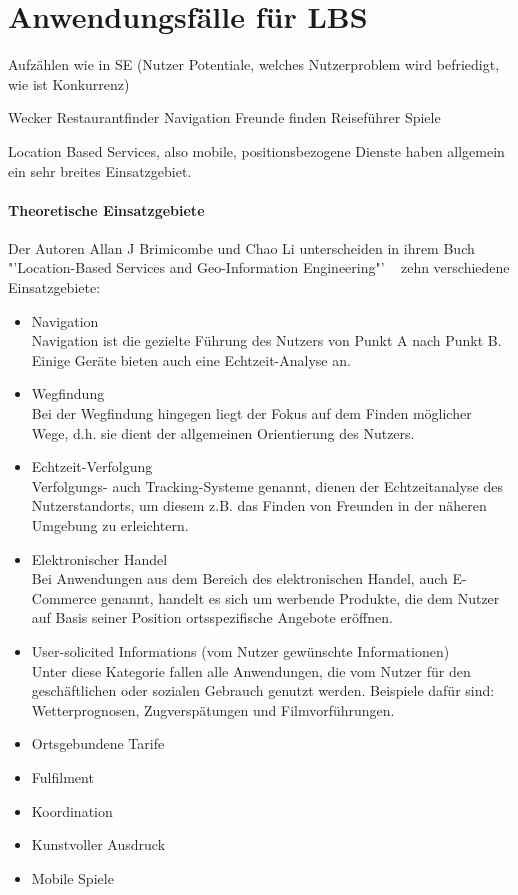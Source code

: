 \section{Anwendungsfälle für LBS}

Aufzählen wie in SE (Nutzer Potentiale, welches Nutzerproblem wird befriedigt, wie ist Konkurrenz)

Wecker
Restaurantfinder
Navigation
Freunde finden
Reiseführer
Spiele



Location Based Services, also mobile, positionsbezogene Dienste haben allgemein ein sehr breites Einsatzgebiet.\\
\paragraph{Theoretische Einsatzgebiete}
Der Autoren Allan J Brimicombe und Chao Li unterscheiden in ihrem Buch "'Location-Based Services and Geo-Information Engineering"' ~\cite[S.132]{brimicombe_li:application_area} zehn verschiedene Einsatzgebiete:
\begin{itemize}
	\item Navigation\\
Navigation ist die gezielte Führung des Nutzers von Punkt A nach Punkt B. Einige Geräte bieten auch eine Echtzeit-Analyse an.
	\item Wegfindung\\
Bei der Wegfindung hingegen liegt der Fokus auf dem Finden möglicher Wege, d.h. sie dient der allgemeinen Orientierung des Nutzers.
	\item Echtzeit-Verfolgung\\
Verfolgungs- auch Tracking-Systeme genannt, dienen der Echtzeitanalyse des Nutzerstandorts, um diesem z.B. das Finden von Freunden in der näheren Umgebung zu erleichtern.
	\item Elektronischer Handel\\
Bei Anwendungen aus dem Bereich des elektronischen Handel, auch E-Commerce genannt, handelt es sich um werbende Produkte, die dem Nutzer auf Basis seiner Position ortsspezifische Angebote eröffnen.
	\item User-solicited Informations (vom Nutzer gewünschte Informationen)\\
Unter diese Kategorie fallen alle Anwendungen, die vom Nutzer für den geschäftlichen oder sozialen Gebrauch genutzt werden. Beispiele dafür sind: Wetterprognosen, Zugverspätungen und Filmvorführungen.
	\item Ortsgebundene Tarife
	\item Fulfilment
	\item Koordination
	\item Kunstvoller Ausdruck
	\item Mobile Spiele
\end{itemize}

